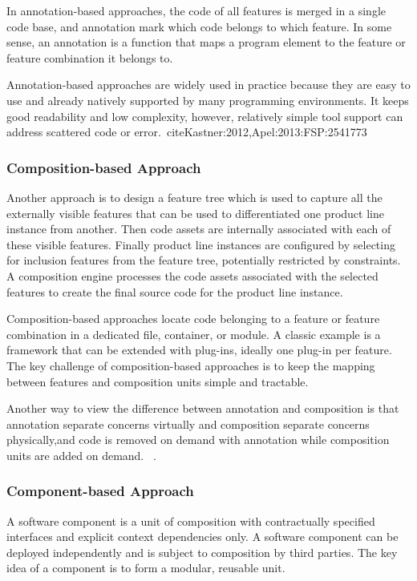 In annotation-based approaches, the code of all features is merged in a single code base, and annotation mark which code
 belongs to which feature. In some sense, an annotation is a function that maps a program element to the feature or
 feature combination it belongs to.

Annotation-based approaches are widely used in practice because they are easy to use and already natively supported
by many programming environments. It keeps good readability and low complexity, however, relatively simple tool support
can address scattered code or error.~cite{Kastner:2012,Apel:2013:FSP:2541773}



\subsubsection{Composition-based Approach}

Another approach is to design a feature tree which is used to capture all the externally visible features that
can be used to differentiated one product line instance from another. Then code assets are internally associated
 with each of these visible features. Finally product line instances are configured by selecting for inclusion
  features from the feature tree, potentially restricted by constraints. A composition engine processes the
  code assets associated with the selected features to create the final source code for the product line instance.

Composition-based approaches locate code belonging to a feature or feature combination in a dedicated file,
container, or module. A classic example is a framework that can be extended with plug-ins, ideally one plug-in
per feature. The key challenge of composition-based approaches is to keep the mapping between features and
composition units simple and tractable.

Another way to view the difference between annotation and composition is that annotation separate concerns
virtually and composition separate concerns physically,and code is removed on demand with annotation while
composition units are added on demand. ~\cite{Thum:2014:FEF:2537169.2537315,Apel:2013:FSP:2541773}.

\subsubsection{Component-based Approach}

A software component is a unit of composition with contractually specified interfaces and explicit context
dependencies only. A software component can be deployed independently and is subject to composition by third
parties. The key idea of a component is to form a modular, reusable unit.

